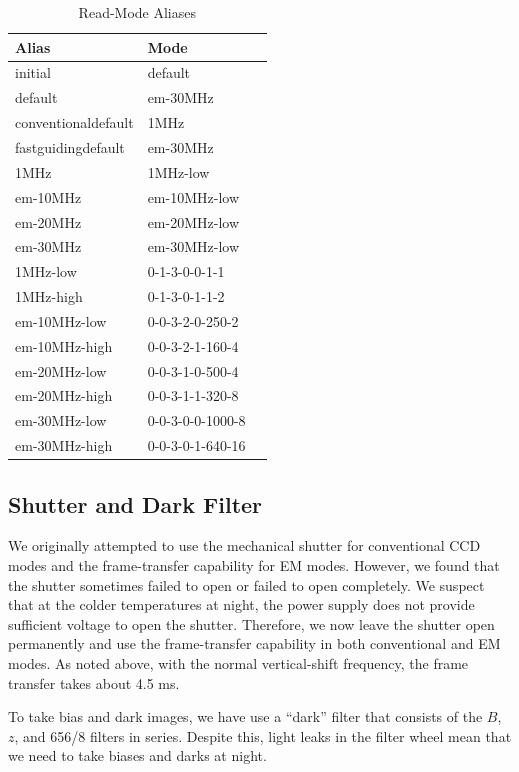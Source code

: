 \begin{table}
\caption{Read-Mode Aliases}
\label{table:read-mode-aliases}
\begin{center}
\begin{tabular}{lll}
\hline
Alias&Mode\\
\hline
 initial&default\\
 default&em-30MHz\\
 conventionaldefault&1MHz\\
 fastguidingdefault&em-30MHz\\
 1MHz&1MHz-low\\
 em-10MHz&em-10MHz-low\\
 em-20MHz&em-20MHz-low\\
 em-30MHz&em-30MHz-low\\
 1MHz-low&0-1-3-0-0-1-1\\
 1MHz-high&0-1-3-0-1-1-2\\
 em-10MHz-low&0-0-3-2-0-250-2\\
 em-10MHz-high&0-0-3-2-1-160-4\\
 em-20MHz-low&0-0-3-1-0-500-4\\
 em-20MHz-high&0-0-3-1-1-320-8\\
 em-30MHz-low&0-0-3-0-0-1000-8\\
 em-30MHz-high&0-0-3-0-1-640-16\\
 \hline
\end{tabular}
\end{center}
\end{table}

\subsection{Shutter and Dark Filter}

\label{section:shutter}

We originally attempted to use the mechanical shutter for conventional CCD modes and the frame-transfer capability for EM modes. However, we found that the shutter sometimes failed to open or failed to open completely. We suspect that at the colder temperatures at night, the power supply does not provide sufficient voltage to open the shutter.  Therefore, we now leave the shutter open permanently and use the frame-transfer capability in both conventional and EM modes. As noted above, with the normal vertical-shift frequency, the frame transfer takes about 4.5 ms.

To take bias and dark images, we have use a “dark” filter that consists of the $B$, $z$, and 656/8 filters in series. Despite this, light leaks in the filter wheel mean that we need to take biases and darks at night.

